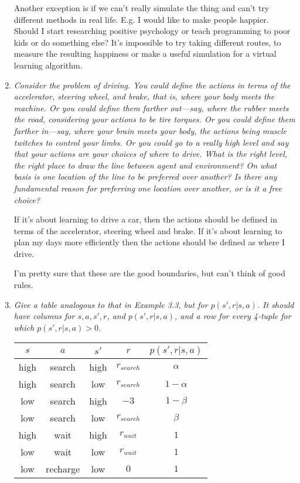 \documentclass[12pt,a4paper]{article}
\begin{document}
\begin{enumerate}
    Another exception is if we can't really simulate the thing and can't try
    different methods in real life. E.g. I would like to make people happier. Should
    I start researching positive psychology or teach programming to poor kids or do something
    else? It's impossible to try taking different routes, to measure the resulting happiness
    or make a useful simulation for a virtual learning algorithm.
  \item
    \textit{Consider the problem of driving. You could define the actions in terms of
    the accelerator, steering wheel, and brake, that is, where your body meets the machine.
    Or you could define them farther out—say, where the rubber meets the road, considering
    your actions to be tire torques. Or you could define them farther in—say, where your
    brain meets your body, the actions being muscle twitches to control your limbs. Or you
    could go to a really high level and say that your actions are your choices of where to drive.
    What is the right level, the right place to draw the line between agent and environment?
    On what basis is one location of the line to be preferred over another? Is there any
    fundamental reason for preferring one location over another, or is it a free choice?}

    If it's about learning to drive a car, then the actions should be defined in terms
    of the accelerator, steering wheel and brake. If it's about learning to plan my
    days more efficiently then the actions should be defined as where I drive.

    I'm pretty sure that these are the good boundaries, but can't think of good
    rules.

  \item
    \textit{Give a table analogous to that in Example 3.3, but for $p(s', r|s, a)$. It
      should have columns for $s, a, s', r$, and $p(s', r|s, a)$, and a row for every 4-tuple
      for which $p(s', r | s, a) > 0$.}

    \begin{center}
      \begin{tabular}{ c|c|c|c|c }
        $s$ & $a$ & $s'$ & $r$ & $p(s', r | s, a)$ \\
       \hline
       high & search & high & $r_{search}$ & $\alpha$ \\
       high & search & low & $r_{search}$ & $1 - \alpha$ \\
       low & search & high & $-3$ & $1 - \beta$ \\
       low & search & low & $r_{search}$ & $\beta$ \\
       high & wait & high & $r_{wait}$ & $1$ \\
       low & wait & low & $r_{wait}$ & $1$ \\
       low & recharge & low & $0$ & $1$ \\
      \end{tabular}
    \end{center}


\end{enumerate}
\end{document}
